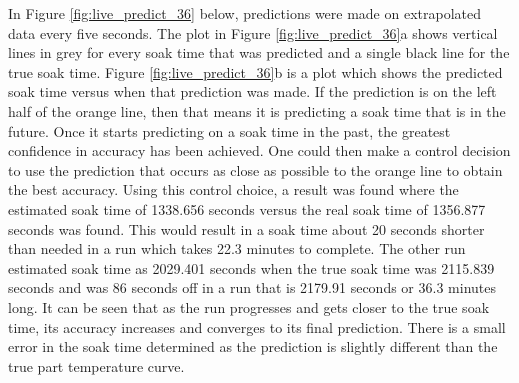 \newpage
In Figure \ref{fig:live_predict_36} below, predictions were made on extrapolated data every five seconds. The plot in Figure \ref{fig:live_predict_36}a shows vertical lines in grey for every soak time that was predicted and a single black line for the true soak time. Figure \ref{fig:live_predict_36}b is a plot which shows the predicted soak time versus when that prediction was made. If the prediction is on the left half of the orange line, then that means it is predicting a soak time that is in the future. Once it starts predicting on a soak time in the past, the greatest confidence in accuracy has been achieved. One could then make a control decision to use the prediction that occurs as close as possible to the orange line to obtain the best accuracy. Using this control choice, a result was found where the estimated soak time of 1338.656 seconds versus the real soak time of 1356.877 seconds was found. This would result in a soak time about 20 seconds shorter than needed in a run which takes 22.3 minutes to complete. The other run estimated soak time as 2029.401 seconds when the true soak time was 2115.839 seconds and was 86 seconds off in a run that is 2179.91 seconds or 36.3 minutes long. It can be seen that as the run progresses and gets closer to the true soak time, its accuracy increases and converges to its final prediction. There is a small error in the soak time determined as the prediction is slightly different than the true part temperature curve.
